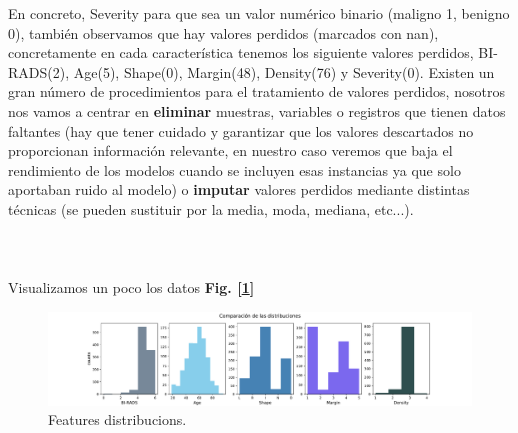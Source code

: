 \documentclass[12pt,twoside]{report}
\begin{document}
En concreto, Severity para que sea un valor numérico binario (maligno 1, benigno 0), también observamos que hay valores perdidos (marcados con nan), concretamente en cada característica tenemos los siguiente valores perdidos, BI-RADS(2), Age(5), Shape(0), Margin(48), Density(76) y Severity(0). Existen un gran número de procedimientos para el tratamiento de valores perdidos, nosotros nos vamos a centrar en \textbf{eliminar} muestras, variables o registros que tienen datos faltantes (hay que tener cuidado y garantizar que los valores descartados no proporcionan información relevante, en nuestro caso veremos que baja el rendimiento de los modelos cuando se incluyen esas instancias ya que solo aportaban ruido al modelo) o \textbf{imputar} valores perdidos mediante distintas técnicas (se pueden sustituir por la media, moda, mediana, etc...).
\\
\\
\\
\\
Visualizamos un poco los datos  \textbf{Fig. [\ref{features-distribucions}]}
\begin{figure}[h]
\includegraphics[width=16cm]{./code/figures_python/compare_distribucions.pdf}
\caption{Features distribucions.}
\label{features-distribucions}
\end{figure}
\end{document}
